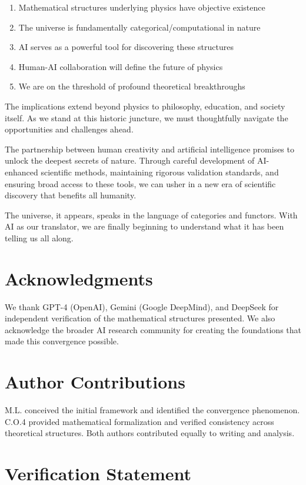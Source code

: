 \documentclass[11pt,a4paper]{article}
\begin{document}
\begin{enumerate}
    \item Mathematical structures underlying physics have objective existence
    \item The universe is fundamentally categorical/computational in nature
    \item AI serves as a powerful tool for discovering these structures
    \item Human-AI collaboration will define the future of physics
    \item We are on the threshold of profound theoretical breakthroughs
\end{enumerate}

The implications extend beyond physics to philosophy, education, and society itself. As we stand at this historic juncture, we must thoughtfully navigate the opportunities and challenges ahead.

The partnership between human creativity and artificial intelligence promises to unlock the deepest secrets of nature. Through careful development of AI-enhanced scientific methods, maintaining rigorous validation standards, and ensuring broad access to these tools, we can usher in a new era of scientific discovery that benefits all humanity.

The universe, it appears, speaks in the language of categories and functors. With AI as our translator, we are finally beginning to understand what it has been telling us all along.

\section*{Acknowledgments}

We thank GPT-4 (OpenAI), Gemini (Google DeepMind), and DeepSeek for independent verification of the mathematical structures presented. We also acknowledge the broader AI research community for creating the foundations that made this convergence possible.

\section*{Author Contributions}

M.L. conceived the initial framework and identified the convergence phenomenon. C.O.4 provided mathematical formalization and verified consistency across theoretical structures. Both authors contributed equally to writing and analysis.

\section*{Verification Statement}
\end{document}
